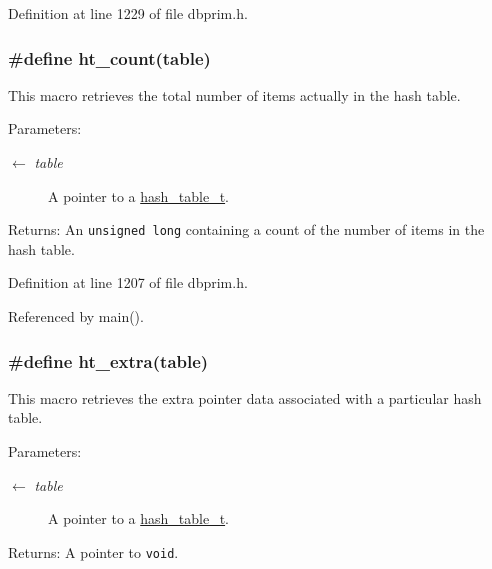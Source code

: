 Definition at line 1229 of file dbprim.h.\hypertarget{group__dbprim__hash_ga30}{
\subsubsection[ht\_\-count]{\setlength{\rightskip}{0pt plus 5cm}\#define ht\_\-count(table)}}
\label{group__dbprim__hash_ga30}


This macro retrieves the total number of items actually in the hash table.

\begin{Desc}
\item[Parameters:]
\begin{description}
\item[\mbox{$\leftarrow$} {\em table}]A pointer to a \hyperlink{group__dbprim__hash_ga1}{hash\_\-table\_\-t}.\end{description}
\end{Desc}
\begin{Desc}
\item[Returns:]An {\tt unsigned long} containing a count of the number of items in the hash table.\end{Desc}


Definition at line 1207 of file dbprim.h.

Referenced by main().\hypertarget{group__dbprim__hash_ga34}{
\subsubsection[ht\_\-extra]{\setlength{\rightskip}{0pt plus 5cm}\#define ht\_\-extra(table)}}
\label{group__dbprim__hash_ga34}


This macro retrieves the extra pointer data associated with a particular hash table.

\begin{Desc}
\item[Parameters:]
\begin{description}
\item[\mbox{$\leftarrow$} {\em table}]A pointer to a \hyperlink{group__dbprim__hash_ga1}{hash\_\-table\_\-t}.\end{description}
\end{Desc}
\begin{Desc}
\item[Returns:]A pointer to {\tt void}.\end{Desc}


